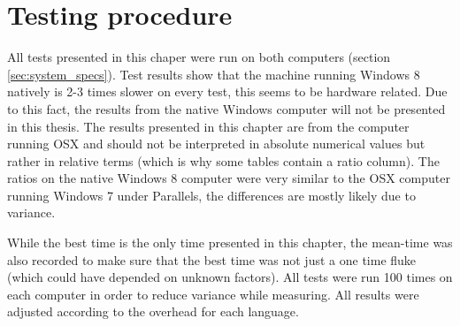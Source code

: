 \section{Testing procedure}
All tests presented in this chaper were run on both computers (section \ref{sec:system_specs}). Test results show that the machine running Windows 8 natively is 2-3 times slower on every test, this seems to be hardware related. Due to this fact, the results from the native Windows computer will not be presented in this thesis. The results presented in this chapter are from the computer running OSX and should not be interpreted in absolute numerical values but rather in relative terms (which is why some tables contain a ratio column). The ratios on the native Windows 8 computer were very similar to the OSX computer running Windows 7 under Parallels, the differences are mostly likely due to variance.

While the best time is the only time presented in this chapter, the mean-time was also recorded to make sure that the best time was not just a one time fluke (which could have depended on unknown factors). All tests were run 100 times on each computer in order to reduce variance while measuring. All results were adjusted according to the overhead for each language.